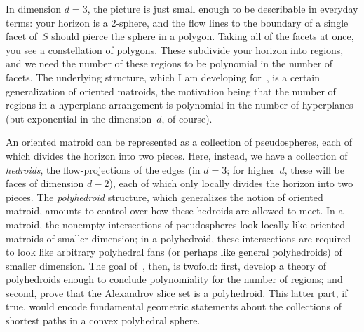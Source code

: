 \documentclass[11pt]{proposal}
\begin{document}
In dimension $d=3$, the picture is just small enough to be describable
in everyday terms: your horizon is a $2$-sphere, and the flow lines to
the boundary of a single facet of~$S$ should pierce the sphere in a
polygon.  Taking all of the facets at once, you see a constellation of
polygons.  These subdivide your horizon into regions, and we need the
number of these regions to be polynomial in the number of facets.  The
underlying structure, which I am developing for~\cite{complexity}, is
a certain generalization of oriented matroids, the motivation being
that the number of regions in a hyperplane arrangement is polynomial
in the number of hyperplanes (but exponential in the dimension~$d$, of
course).

An oriented matroid can be represented as a collection of
pseudospheres, each of which divides the horizon into two pieces.
Here, instead, we have a collection of \emph{hedroids}, the
flow-projections of the edges (in $d=3$; for higher~$d$, these will be
faces of dimension $d-2$), each of which only locally divides the
horizon into two pieces.  The \emph{polyhedroid} structure, which
generalizes the notion of oriented matroid, amounts to control over
how these hedroids are allowed to meet.  In a matroid, the nonempty
intersections of pseudospheres look locally like oriented matroids of
smaller dimension; in a polyhedroid, these intersections are required
to look like arbitrary polyhedral fans (or perhaps like general
polyhedroids) of smaller dimension.  The goal of~\cite{complexity},
then, is twofold: first, develop a theory of polyhedroids enough to
conclude polynomiality for the number of regions; and second, prove
that the Alexandrov slice set is a polyhedroid.  This latter part, if
true, would encode fundamental geometric statements about the
collections of shortest paths in a convex polyhedral sphere.
\end{document}

